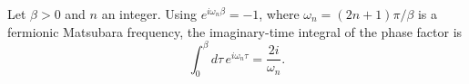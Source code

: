 \documentclass{article}
\begin{document}
Let $\beta>0$ and $n$ an integer. Using $e^{i\omega_n\beta}=-1$, where $\omega_n = (2 n + 1)\pi/\beta$ is a fermionic Matsubara frequency,
the imaginary-time integral of the phase factor is
\begin{equation}
\int_0^{\beta} d\tau\, e^{i\omega_n\tau} = \frac{2i}{\omega_n} .
\label{eq:mats}
\end{equation}
\end{document}
